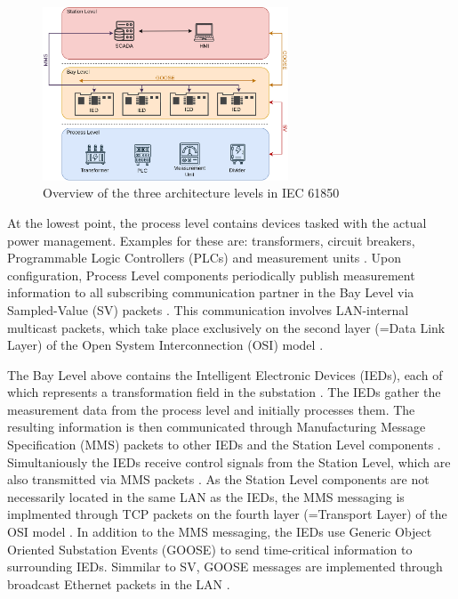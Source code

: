 \documentclass[conference, onecolumn, a4paper]{IEEEtran}
\begin{document}
\begin{figure}[h]
    \centering
    \includegraphics[width=0.65\textwidth]{images/IEC61850_Architecture.png}
    \caption{Overview of the three architecture levels in IEC 61850 \cite{SGRWin_IEC61850Architecture:2021}}
    \label{image:IEC61850Architecture}
\end{figure}

\noindent At the lowest point, the process level contains devices tasked with the actual power management. Examples for these are: transformers, circuit 
breakers, Programmable Logic Controllers (PLCs) and measurement units \cite{SGRWin_IEC61850Architecture:2021}. Upon configuration, Process Level components 
periodically publish measurement information to all subscribing communication partner in the Bay Level via Sampled-Value (SV) packets 
\cite{TyphoonHIL_IEC61850SV:2021}. This communication involves LAN-internal multicast packets, which take place exclusively on the second layer 
(=Data Link Layer) of the Open System Interconnection (OSI) model \cite{TyphoonHIL_IEC61850SV:2021}. 

\smallskip
The Bay Level above contains the Intelligent Electronic Devices (IEDs), each of which represents a transformation field in the substation 
\cite[p. 39]{IEC61850-7-1:2011}. The IEDs gather the measurement data from the process level and initially processes them. The resulting information 
is then communicated through Manufacturing Message Specification (MMS) packets to other IEDs and the Station Level components \cite[p. 44]{IEC61850-8-1:2011}. 
Simultaniously the IEDs receive control signals from the Station Level, which are also transmitted via MMS packets \cite{trafficGen_IEC61850:2011}. 
As the Station Level components are not necessarily located in the same LAN as the IEDs, the MMS messaging is implmented through TCP packets on the 
fourth layer (=Transport Layer) of the OSI model \cite[p. 45]{IEC61850-8-1:2011}. In addition to the MMS messaging, the IEDs use Generic Object 
Oriented Substation Events (GOOSE) to send time-critical information to surrounding IEDs. Simmilar to SV, GOOSE messages are implemented through 
broadcast Ethernet packets in the LAN \cite{GOOSE_confidentiality_integrity:2020}.
\end{document}
